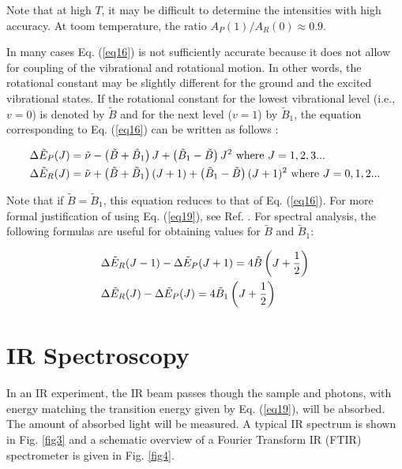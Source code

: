 \documentclass[byrevtex,amssymb,aps,pra,floatfix,letterpaper]{revtex4}
\begin{document}
\noindent
Note that at high $T$, it may be difficult to determine the intensities with high accuracy. At toom temperature, the ratio $A_P(1) / A_R(0) \approx 0.9$.

In many cases Eq. (\ref{eq16}) is not sufficiently accurate because it does not allow for coupling of the vibrational and rotational motion. In other words, the rotational constant may be slightly different for the ground and the excited vibrational states. If the rotational constant for the lowest vibrational level (i.e., $v = 0$) is denoted by $\tilde{B}$ and for the next level ($v = 1$) by $\tilde{B}_1$, the equation corresponding to Eq. (\ref{eq16}) can be written as follows \cite{ATKINS1}:

\begin{align}
\label{eq19}
& \Delta \tilde{E}_P(J) = \tilde{\nu} - \left(\tilde{B} + \tilde{B}_1\right)J + \left(\tilde{B}_1 - \tilde{B}\right)J^2\textnormal{ where }J=1,2,3...\\
\notag
& \Delta \tilde{E}_R(J) = \tilde{\nu} + \left(\tilde{B} + \tilde{B}_1\right)(J+1) + \left(\tilde{B}_1 - \tilde{B}\right)(J+1)^2\textnormal{ where }J=0,1,2...
\end{align}

\noindent
Note that if $\tilde{B} = \tilde{B}_1$, this equation reduces to that of Eq. (\ref{eq16}). For more formal justification of using Eq. (\ref{eq19}), see Ref. \cite{HERZBERG1}. For spectral analysis, the following formulas are useful for obtaining values for $\tilde{B}$ and $\tilde{B}_1$:

\begin{align}
\label{eq20}
& \Delta\tilde{E}_R(J - 1) - \Delta\tilde{E}_P(J+1) = 4\tilde{B}\left(J + \frac{1}{2}\right)\\
\notag
& \Delta\tilde{E}_R(J) - \Delta\tilde{E}_P(J) = 4\tilde{B}_1\left(J + \frac{1}{2}\right)
\end{align}

\section{IR Spectroscopy}

In an IR experiment, the IR beam passes though the sample and photons, with energy matching the transition energy given by Eq. (\ref{eq19}), will be absorbed. The amount of absorbed light will be measured. A typical IR spectrum is shown in Fig. \ref{fig3} and a schematic overview of a Fourier Transform IR (FTIR) spectrometer is given in Fig. \ref{fig4}.
\end{document}
